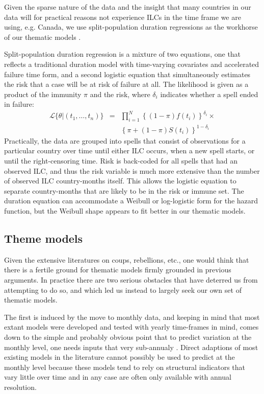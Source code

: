 \documentclass[pdftex,11pt]{article}
\begin{document}
Given the sparse nature of the data and the insight that many countries in our data will for practical reasons not experience ILCs in the time frame we are using, e.g. Canada, we use split-population duration regressions as the workhorse of our thematic models \citep[for an application in political science, see][]{svolik:2008}. 

Split-population duration regression is a mixture of two equations, one that reflects a traditional duration model with time-varying covariates and accelerated failure time form, and a second logistic equation that simultaneously estimates the risk that a case will be at risk of failure at all. The likelihood is given as a product of the immunity $\pi$ and the risk, where $\delta_i$ indicates whether a spell ended in failure: 
\begin{eqnarray*}
\mathcal{L}\{\theta|(t_{1}, \dots, t_{n})\} &=& \prod_{i=1}^{N} \left\{(1-\pi) f(t_i)\right\}^{\delta_i} \times \\
&&   \left\{\pi + (1-\pi)S(t_i)\right\}^{1-\delta_i}
\end{eqnarray*}
Practically, the data are grouped into spells that consist of observations for a particular country over time until either ILC occurs, when a new spell starts, or until the right-censoring time. Risk is back-coded for all spells that had an observed ILC, and thus the risk variable is much more extensive than the number of observed ILC country-months itself. This allows the logistic equation to separate country-months that are likely to be in the risk or immune set. The duration equation can accommodate a Weibull or log-logistic form for the hazard function, but the Weibull shape appears to fit better in our thematic models. 

\subsection{Theme models}

Given the extensive literatures on coups, rebellions, etc., one would think that there is a fertile ground for thematic models firmly grounded in previous arguments. In practice there are two serious obstacles that have deterred us from attempting to do so, and which led us instead to largely seek our own set of thematic models. 

The first is induced by the move to monthly data, and keeping in mind that most extant models were developed and tested with yearly time-frames in mind, comes down to the simple and probably obvious point that to predict variation at the monthly level, one needs inputs that very sub-annualy \citep{beger:dorff:etal:nd}. Direct adaptions of most existing models in the literature cannot possibly be used to predict at the monthly level because these models tend to rely on structural indicators that vary little over time and in any case are often only available with annual resolution. 
\end{document}
